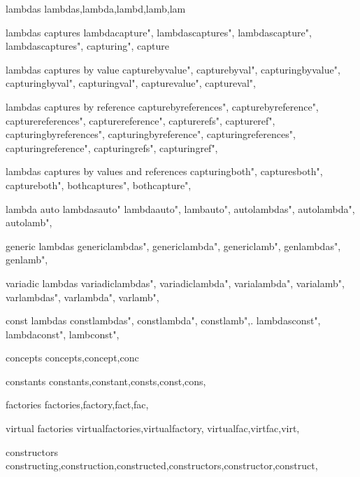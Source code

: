          lambdas
        lambdas,lambda,lambd,lamb,lam
        
         lambdas captures
        lambdacapture",  
        lambdascaptures",  
        lambdascapture",  
        lambdascaptures",  
        capturing",  
        capture
        
         lambdas captures by value
        capturebyvalue",  
        capturebyval",  
        capturingbyvalue",  
        capturingbyval",  
        capturingval",  
        capturevalue",  
        captureval",  
        
         lambdas captures by reference 
        capturebyreferences",  
        capturebyreference",  
        capturereferences",  
        capturereference",  
        capturerefs",  
        captureref",  
        capturingbyreferences",  
        capturingbyreference",  
        capturingreferences",  
        capturingreference",  
        capturingrefs",  
        capturingref",  
        
         lambdas captures by values and references 
        capturingboth",  
        capturesboth",  
        captureboth",  
        bothcaptures",  
        bothcapture",  
        
         lambda auto
        lambdasauto"
        lambdaauto",
        lambauto",
        autolambdas",
        autolambda",
        autolamb",
        
         generic lambdas
        genericlambdas",  
        genericlambda",  
        genericlamb",  
        genlambdas",  
        genlamb",  
        
         variadic lambdas 
        variadiclambdas",  
        variadiclambda",  
        varialambda",  
        varialamb",  
        varlambdas",  
        varlambda",  
        varlamb",  
        
         const lambdas 
        constlambdas",
        constlambda",
        constlamb",.
        lambdasconst",
        lambdaconst",
        lambconst",
        
         concepts 
        concepts,concept,conc
        
         constants 
        constants,constant,consts,const,cons,
        
         factories 
        factories,factory,fact,fac,
        
         virtual factories 
        virtualfactories,virtualfactory,  
        virtualfac,virtfac,virt,
        
         constructors 
        constructing,construction,constructed,constructors,constructor,construct,
        
